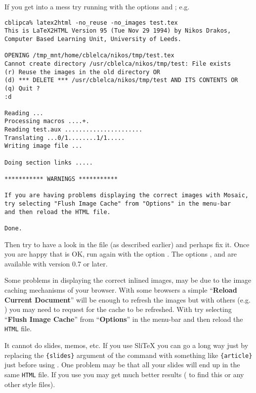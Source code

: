 \begin{htmllist}
If you get into a mess try running \latextohtml{} with the options
 and ; e.g.
\begin{small}
\begin{verbatim}
cblipca% latex2html -no_reuse -no_images test.tex
This is LaTeX2HTML Version 95 (Tue Nov 29 1994) by Nikos Drakos,
Computer Based Learning Unit, University of Leeds.

OPENING /tmp_mnt/home/cblelca/nikos/tmp/test.tex
Cannot create directory /usr/cblelca/nikos/tmp/test: File exists
(r) Reuse the images in the old directory OR
(d) *** DELETE *** /usr/cblelca/nikos/tmp/test AND ITS CONTENTS OR
(q) Quit ?
:d

Reading ...
Processing macros ....+.
Reading test.aux ......................
Translating ...0/1........1/1.....
Writing image file ...

Doing section links .....

*********** WARNINGS ***********

If you are having problems displaying the correct images with Mosaic,
try selecting "Flush Image Cache" from "Options" in the menu-bar
and then reload the HTML file.

Done.
\end{verbatim}
\end{small}
Then try to have a look in the file  
(as described earlier) and perhaps fix it.
Once you are happy that  is OK, run \latextohtml{}
again with the option .
The options ,  and 
are available with \latextohtml{} version 0.7 or later.

Some problems in displaying the correct inlined images,
may be due to the image caching mechanisms of your browser.
With some browsers a simple ``\textbf{Reload Current Document}'' will be enough
to refresh the images but with others (e.g. ) you may need
to request for the cache to be refreshed. With  try
selecting ``\textbf{Flush Image Cache}'' from ``\textbf{Options}'' in the menu-bar
and then reload the \texttt{HTML} file.


\item [It cannot do slides, memos, etc. ]
If you use Sli\TeX{} you can go a long way just by replacing
the \verb|{slides}| argument of the  command with
something like \verb|{article}| just before using \latextohtml.
One problem may be that all your slides will end up in the  same \texttt{HTML}
file.
If you use  you may get much better results
(
to find this or any other style files).
\end{htmllist}

